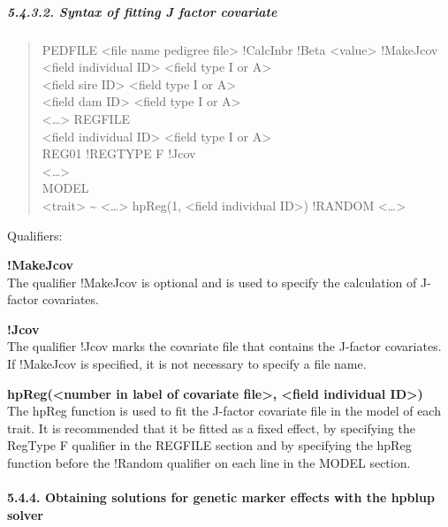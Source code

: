 \subparagraph{5.4.3.2. Syntax of fitting J factor
covariate}\label{Gene52}

\begin{quote}
PEDFILE \textless file name pedigree file\textgreater{} !CalcInbr !Beta
\textless value\textgreater{} !MakeJcov\\
\textless field individual ID\textgreater{} \textless field type I or
A\textgreater{}\\
\textless field sire ID\textgreater{} \textless field type I or
A\textgreater{}\\
\textless field dam ID\textgreater{} \textless field type I or
A\textgreater{}\\
\textless\ldots\textgreater{} REGFILE\\
\textless field individual ID\textgreater{} \textless field type I or
A\textgreater{}\\
REG01 !REGTYPE F !Jcov\\
\textless\ldots\textgreater{}\\
MODEL\\
\textless trait\textgreater{} \textasciitilde{}
\textless\ldots\textgreater{} hpReg(1, \textless field individual
ID\textgreater) !RANDOM \textless\ldots\textgreater{}
\end{quote}

Qualifiers:

\textbf{!MakeJcov}\\
The qualifier !MakeJcov is optional and is used to specify the
calculation of J-factor covariates.

\textbf{!Jcov}\\
The qualifier !Jcov marks the covariate file that contains the J-factor
covariates. If !MakeJcov is specified, it is not necessary to specify a
file name.

\textbf{hpReg(\textless number in label of covariate file\textgreater,
\textless field individual ID\textgreater)}\\
The hpReg function is used to fit the J-factor covariate file in the
model of each trait. It is recommended that it be fitted as a fixed
effect, by specifying the RegType F qualifier in the REGFILE section and
by specifying the hpReg function before the !Random qualifier on each
line in the MODEL section.

\paragraph{5.4.4. Obtaining solutions for genetic marker effects with
the hpblup solver}\label{Gene53}

